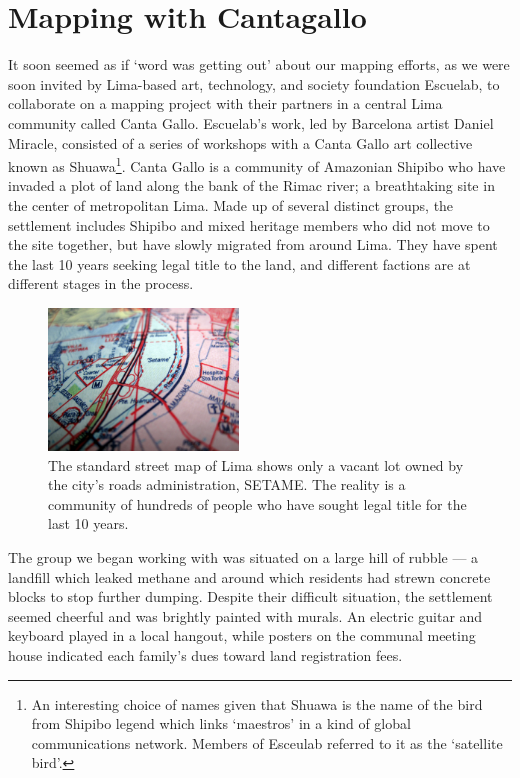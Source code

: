 \documentclass[11pt,oneside,notitlepage]{report}
\begin{document}
{{\section{Mapping with Cantagallo}

It soon seemed as if `word was getting out' about our mapping efforts, as we were soon invited by Lima-based art, technology, and society foundation Escuelab, to collaborate on a mapping project with their partners in a central Lima community called Canta Gallo. Escuelab's work, led by Barcelona artist Daniel Miracle, consisted of a series of workshops with a Canta Gallo art collective known as Shuawa\footnote{An interesting choice of names given that Shuawa is the name of the bird from Shipibo legend which links `maestros' in a kind of global communications network. Members of Esceulab referred to it as the `satellite bird'.}. Canta Gallo is a community of Amazonian Shipibo who have invaded a plot of land along the bank of the Rimac river; a breathtaking site in the center of metropolitan Lima. Made up of several distinct groups, the settlement includes Shipibo and mixed heritage members who did not move to the site together, but have slowly migrated from around Lima. They have spent the last 10 years seeking legal title to the land, and different factions are at different stages in the process. 

\begin{figure}
	\begin{flushright}
		\includegraphics[width=0.45\textwidth]{images/canta-gallo-setame.jpg}
		\caption{The standard street map of Lima shows only a vacant lot owned by the city's roads administration, SETAME. The reality is a community of hundreds of people who have sought legal title for the last 10 years.} 
	\end{flushright}
\end{figure}

The group we began working with was situated on a large hill of rubble --- a landfill which leaked methane and around which residents had strewn concrete blocks to stop further dumping. Despite their difficult situation, the settlement seemed cheerful and was brightly painted with murals. An electric guitar and keyboard played in a local hangout, while posters on the communal meeting house indicated each family's dues toward land registration fees. 

}}
\end{document}
